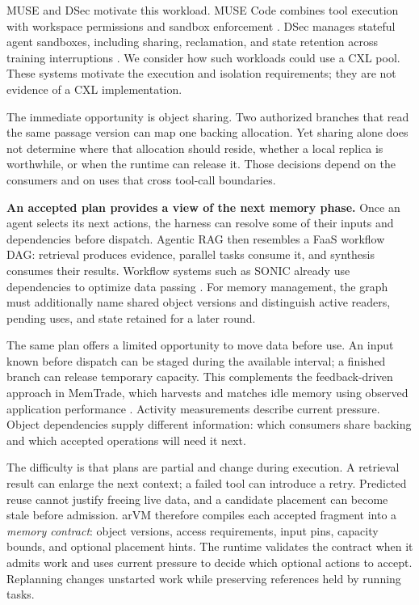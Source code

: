 \documentclass[letterpaper,twocolumn,10pt]{article}
\newcommand{\arvm}{arVM\xspace}
\newcommand{\memtrade}{MemTrade\xspace}
\begin{document}
MUSE and DSec motivate this workload. MUSE Code combines tool execution with
workspace permissions and sandbox enforcement \cite{musepermissions}.
DSec manages stateful agent sandboxes, including sharing, reclamation, and
state retention across training interruptions \cite{dsec2026}. We consider
how such workloads could use a CXL pool. These systems motivate the execution
and isolation requirements; they are not evidence of a CXL implementation.

The immediate opportunity is object sharing. Two authorized branches that read the same passage
version can map one backing allocation. Yet sharing alone does not determine
where that allocation should reside, whether a local replica is worthwhile,
or when the runtime can release it. Those decisions depend on the consumers
and on uses that cross tool-call boundaries.

\textbf{An accepted plan provides a view of the next memory phase.}
Once an agent selects its next actions, the harness can resolve some of their
inputs and dependencies before dispatch. Agentic RAG then resembles a FaaS
workflow DAG: retrieval produces evidence, parallel tasks consume it, and
synthesis consumes their results. Workflow systems such as SONIC already use
dependencies to optimize data passing \cite{sonic2021}. For memory management,
the graph must additionally name shared object versions and distinguish
active readers, pending uses, and state retained for a later round.

The same plan offers a limited opportunity to move data before use. An input
known before dispatch can be staged during the available interval; a finished
branch can release temporary capacity. This complements the feedback-driven
approach in \memtrade, which harvests and matches idle memory using observed
application performance \cite{memtrade2021}. Activity measurements describe
current pressure. Object dependencies supply different information: which
consumers share backing and which accepted operations will need it next.

The difficulty is that plans are partial and change during execution.
A retrieval result can enlarge the next context; a failed tool can introduce
a retry. Predicted reuse cannot justify freeing live data, and a candidate
placement can become stale before admission. \arvm therefore compiles each
accepted fragment into a \emph{memory contract}: object versions, access
requirements, input pins, capacity bounds, and optional placement hints.
The runtime validates the contract when it admits work and uses current
pressure to decide which optional actions to accept. Replanning changes
unstarted work while preserving references held by running tasks.
\end{document}
